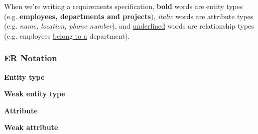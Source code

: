 When we're writing a requirements specification, \textbf{bold} words are entity
types (e.g. \textbf{employees, departments and projects}), \textit{italic} words
are attribute types (e.g. \textit{name, location, phone number}), and
\underline{underlined} words are relationship types (e.g. employees
\underline{belong to a} department).

\subsubsection{ER Notation}

\begin{mymulticols}

  \begin{description}
    \item \textbf{Entity type}\\
    \begin{center}
    \end{center}

    \item \textbf{Weak entity type}\\
    \begin{center}
    \end{center}

    \item \textbf{Attribute}\\
    \begin{center}
    \end{center}

    \item \textbf{Weak attribute}\\
    \begin{center}
    \end{center}


\end{description}
\end{mymulticols}
